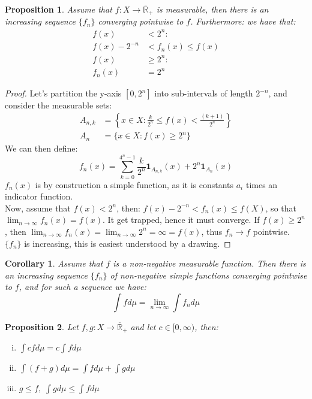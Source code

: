 \documentclass{article}
\newcommand{\Rbar}{\overline{\mathbb{R}}}%
\newtheorem{prop}{Proposition}
\newtheorem{proof}{Proof}
\newtheorem{cor}{Corollary}
\begin{document}
\begin{prop}
Assume that $f:X\to \Rbar_{+}$ is measurable, then there is an increasing sequence $\{f_{n}\}$ converging pointwise to $f$. Furthermore: we have that: 
\begin{align*}
f(x) &< 2^{n}:\\
f(x) -2^{-n} &< f_{n}(x) \leq f(x) \\ 
f(x) &\geq 2^{n}:\\ 
f_{n}(x) &= 2^{n}
\end{align*}
\end{prop}
\begin{proof}
Let's partition the y-axis $[0,2^{n}]$ into sub-intervals of length $2^{-n}$, and consider the measurable sets: 
\begin{align*}
A_{n,k} &= \left\{x\in X: \frac{k}{2^{n}} \leq f(x) < \frac{(k+1)}{2^{n}} \right\}\\ 
A_{n} &= \{x\in X: f(x) \geq 2^{n}\}
\end{align*}
We can then define: 
\[ f_{n}(x) = \sum_{k=0}^{4^{n}-1} \frac{k}{2^{n}}\bm{1}_{A_{n,k}}(x) + 2^{n}\bm{1}_{A_{n}}(x)
\]
$f_{n}(x)$ is by construction a simple function, as it is constants $a_{i}$ times an indicator function.\\ 
Now, assume that $f(x) < 2^{n}$, then: $f(x) -2^{-n} < f_{n}(x) \leq f(X)$, so that $\lim_{n\to \infty}f_{n}(x) = f(x)$. It get trapped, hence it must converge. If $f(x) \geq 2^{n}$, then $\lim_{n\to \infty} f_{n}(x) = \lim_{n\to \infty}2^{n} = \infty = f(x)$, thus $f_{n} \to f$ pointwise. $\{f_{n}\}$ is increasing, this is easiest understood by a drawing. 
\end{proof}

\begin{cor}
Assume that $f$ is a non-negative measurable function. Then there is an increasing sequence $\{f_{n}\}$ of non-negative simple functions converging pointwise to $f$, and for such a sequence we have: 
\[\int fd\mu = \lim_{n\to \infty}\int f_{n}d\mu
\]
\end{cor}

\begin{prop}
Let $f,g:X\to \Rbar_{+}$ and let $c\in [0,\infty)$, then: 
\begin{enumerate}[i)]
    \item $\int cfd\mu = c\int fd\mu$
    \item $\int (f+g)d\mu = \int fd\mu + \int gd\mu$
    \item $g\leq f, \; \int gd\mu \leq \int fd\mu$
\end{enumerate}
\end{prop}
\end{document}
